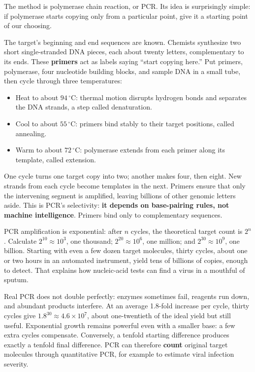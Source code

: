 The method is polymerase chain reaction, or PCR. Its idea is surprisingly simple: if polymerase starts copying only from a particular point, give it a starting point of our choosing.

The target's beginning and end sequences are known. Chemists synthesize two short single-stranded DNA pieces, each about twenty letters, complementary to its ends. These \textbf{primers} act as labels saying ``start copying here.'' Put primers, polymerase, four nucleotide building blocks, and sample DNA in a small tube, then cycle through three temperatures:

\begin{itemize}[itemsep=2pt]
\item Heat to about $94\,^{\circ}\mathrm{C}$: thermal motion disrupts hydrogen bonds and separates the DNA strands, a step called denaturation.
\item Cool to about $55\,^{\circ}\mathrm{C}$: primers bind stably to their target positions, called annealing.
\item Warm to about $72\,^{\circ}\mathrm{C}$: polymerase extends from each primer along its template, called extension.
\end{itemize}

One cycle turns one target copy into two; another makes four, then eight. New strands from each cycle become templates in the next. Primers ensure that only the intervening segment is amplified, leaving billions of other genomic letters aside. This is PCR's selectivity: \textbf{it depends on base-pairing rules, not machine intelligence}. Primers bind only to complementary sequences.

\begin{qiaoliang}
PCR amplification is exponential: after $n$ cycles, the theoretical target count is $2^n$. Calculate $2^{10}\approx 10^3$, one thousand; $2^{20}\approx 10^{6}$, one million; and $2^{30}\approx 10^{9}$, one billion. Starting with even a few dozen target molecules, thirty cycles, about one or two hours in an automated instrument, yield tens of billions of copies, enough to detect. That explains how nucleic-acid tests can find a virus in a mouthful of sputum.

Real PCR does not double perfectly: enzymes sometimes fail, reagents run down, and abundant products interfere. At an average 1.8-fold increase per cycle, thirty cycles give $1.8^{30}\approx 4.6\times 10^{7}$, about one-twentieth of the ideal yield but still useful. Exponential growth remains powerful even with a smaller base: a few extra cycles compensate. Conversely, a tenfold starting difference produces exactly a tenfold final difference. PCR can therefore \textbf{count} original target molecules through quantitative PCR, for example to estimate viral infection severity.
\end{qiaoliang}

